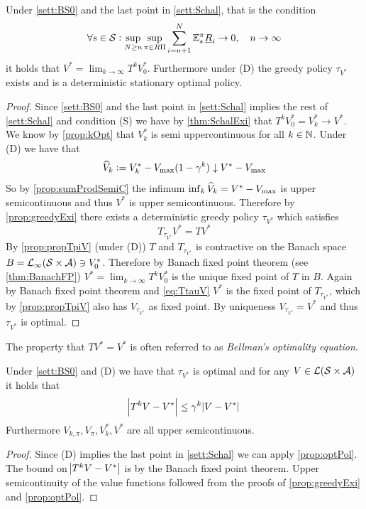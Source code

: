 \begin{prop}
  Under \cref{sett:BS0} and the last point in \cref{sett:Schal},
  that is the condition
  \[ \forall s \in \mathcal{S} : \sup_{N \geq n} \sup_{\pi \in R\Pi} \sum_{i=n+1}^N
  \mathbb{E}_s^\pi \underline{R}_i \to 0, \quad n \to \infty \]
  it holds that $V^* = \lim_{k\to\infty} T^k V^*_0$.
  Furthermore under (D) the greedy policy
  $\tau_{V^*}$ exists and is a deterministic
  stationary optimal policy.
  \label{prop:optPol}
\end{prop}
\begin{proof}
  Since \cref{sett:BS0} and the last point in \cref{sett:Schal} implies
  the rest of \cref{sett:Schal} and condition (S) we have by
  \cref{thm:SchalExi} that $T^k V^*_0 = V^*_k \to V^*$.
  We know by \cref{prop:kOpt} that $V^*_k$ is semi uppercontinuous for all
  $k \in \mathbb{N}$.
  Under (D) we have that
  \[ \widehat{V}_k \vcentcolon= V^*_k - V_{\max} (1 - \gamma^k)
  \downarrow V^* - V_{\max} \]
  So by \cref{prop:sumProdSemiC} the infimum
  $\inf_k \widehat{V}_k = V^* - V_{\max}$ is upper semicontinuous and thus
  $V^*$ is upper semicontinuous.
  Therefore by \cref{prop:greedyExi} there exists a deterministic
  greedy policy $\tau_{V^*}$ which satisfies
  \begin{equation} T_{\tau_{V^*}} V^* = T V^* \label{eq:TtauV} \end{equation}
  By \cref{prop:propTpiV} (under (D)) $T$ and $T_{\tau_{V^*}}$
  is contractive on the Banach space
  $B = \mathcal{L}_\infty(\mathcal{S} \times \mathcal{A}) \ni V^*_0$.
  Therefore by Banach fixed point theorem (see \cref{thm:BanachFP})
  $V^* = \lim_{k\to\infty} T^k V^*_0$ is the unique fixed point
  of $T$ in $B$.
  Again by Banach fixed point theorem and \cref{eq:TtauV} $V^*$ is the fixed
  point of $T_{\tau_{V^*}}$, which by \cref{prop:propTpiV} also has
  $V_{\tau_{V^*}}$ as fixed point. By uniqueness
  $V_{\tau_{V^*}} = V^*$ and thus $\tau_{V^*}$ is optimal.
\end{proof}

\begin{rem}
  The property that $TV^* = V^*$ is often referred to as
  \emph{Bellman's optimality equation}.
\end{rem}

\begin{cor}
  Under \cref{sett:BS0} and (D) we have that $\tau_{V^*}$ is optimal
  and for any $V \in \mathcal{L}(\mathcal{S} \times \mathcal{A})$ it holds that
  \[ \abs{T^k V - V^*} \leq \gamma^k \abs{V - V^*} \]
  Furthermore $V_{k, \pi}, V_\pi, V^*_k, V^*$ are all upper semicontinuous.
  \label{cor:Viteration}
\end{cor}
\begin{proof}
  Since (D) implies the last point in \cref{sett:Schal} we can apply
  \cref{prop:optPol}. The bound on $\abs{T^k V - V^*}$
  is by the Banach fixed point theorem.
  Upper semicontinuity of the value functions followed from the proofs
  of \cref{prop:greedyExi} and \cref{prop:optPol}.
\end{proof}

